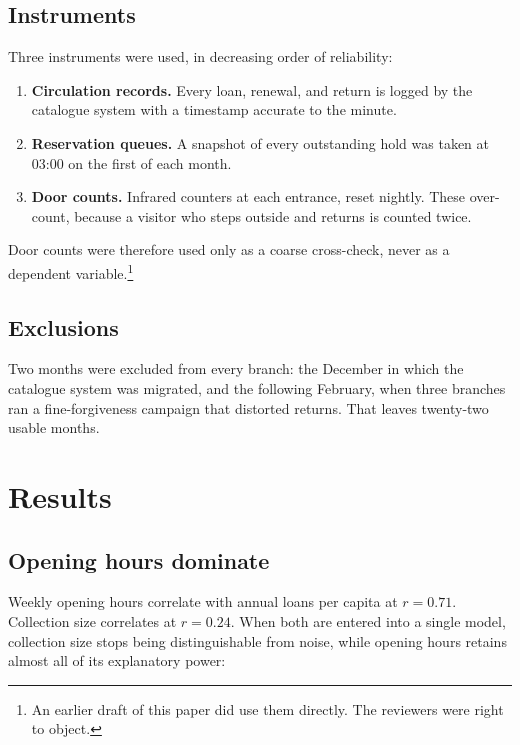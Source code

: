 \documentclass[11pt,a4paper]{article}
\begin{document}
\subsection{Instruments}

Three instruments were used, in decreasing order of reliability:

\begin{enumerate}
  \item \textbf{Circulation records.} Every loan, renewal, and return is logged
        by the catalogue system with a timestamp accurate to the minute.
  \item \textbf{Reservation queues.} A snapshot of every outstanding hold was
        taken at 03:00 on the first of each month.
  \item \textbf{Door counts.} Infrared counters at each entrance, reset nightly.
        These over-count, because a visitor who steps outside and returns is
        counted twice.
\end{enumerate}

Door counts were therefore used only as a coarse cross-check, never as a
dependent variable.\footnote{An earlier draft of this paper did use them
directly. The reviewers were right to object.}

\subsection{Exclusions}

Two months were excluded from every branch: the December in which the catalogue
system was migrated, and the following February, when three branches ran a
fine-forgiveness campaign that distorted returns. That leaves twenty-two
usable months.

\section{Results}
\label{sec:results}

\subsection{Opening hours dominate}

Weekly opening hours correlate with annual loans per capita at
$r = 0.71$. Collection size correlates at $r = 0.24$. When both are entered into
a single model, collection size stops being distinguishable from noise, while
opening hours retains almost all of its explanatory power:
\end{document}
